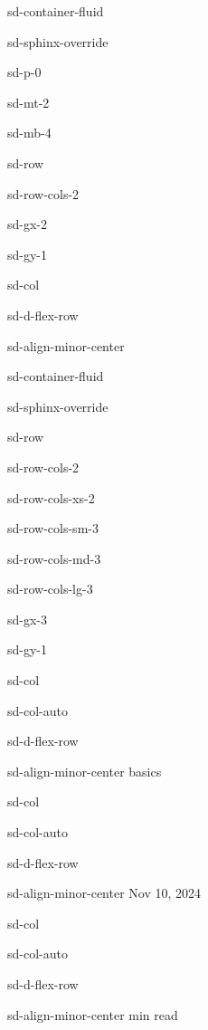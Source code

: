 \documentclass[letterpaper,10pt,english]{jupyterBook}
\begin{document}
\begin{sphinxuseclass}{sd-container-fluid}
\begin{sphinxuseclass}{sd-sphinx-override}
\begin{sphinxuseclass}{sd-p-0}
\begin{sphinxuseclass}{sd-mt-2}
\begin{sphinxuseclass}{sd-mb-4}
\begin{sphinxuseclass}{sd-row}
\begin{sphinxuseclass}{sd-row-cols-2}
\begin{sphinxuseclass}{sd-gx-2}
\begin{sphinxuseclass}{sd-gy-1}
\begin{sphinxuseclass}{sd-col}
\begin{sphinxuseclass}{sd-d-flex-row}
\begin{sphinxuseclass}{sd-align-minor-center}
\begin{sphinxuseclass}{sd-container-fluid}
\begin{sphinxuseclass}{sd-sphinx-override}
\begin{sphinxuseclass}{sd-row}
\begin{sphinxuseclass}{sd-row-cols-2}
\begin{sphinxuseclass}{sd-row-cols-xs-2}
\begin{sphinxuseclass}{sd-row-cols-sm-3}
\begin{sphinxuseclass}{sd-row-cols-md-3}
\begin{sphinxuseclass}{sd-row-cols-lg-3}
\begin{sphinxuseclass}{sd-gx-3}
\begin{sphinxuseclass}{sd-gy-1}
\begin{sphinxuseclass}{sd-col}
\begin{sphinxuseclass}{sd-col-auto}
\begin{sphinxuseclass}{sd-d-flex-row}
\begin{sphinxuseclass}{sd-align-minor-center}
\sphinxAtStartPar
basics

\end{sphinxuseclass}
\end{sphinxuseclass}
\end{sphinxuseclass}
\end{sphinxuseclass}
\begin{sphinxuseclass}{sd-col}
\begin{sphinxuseclass}{sd-col-auto}
\begin{sphinxuseclass}{sd-d-flex-row}
\begin{sphinxuseclass}{sd-align-minor-center}
\sphinxAtStartPar
Nov 10, 2024

\end{sphinxuseclass}
\end{sphinxuseclass}
\end{sphinxuseclass}
\end{sphinxuseclass}
\begin{sphinxuseclass}{sd-col}
\begin{sphinxuseclass}{sd-col-auto}
\begin{sphinxuseclass}{sd-d-flex-row}
\begin{sphinxuseclass}{sd-align-minor-center}
 min read


\end{sphinxuseclass}
\end{sphinxuseclass}
\end{sphinxuseclass}
\end{sphinxuseclass}
\end{sphinxuseclass}
\end{sphinxuseclass}
\end{sphinxuseclass}
\end{sphinxuseclass}
\end{sphinxuseclass}
\end{sphinxuseclass}
\end{sphinxuseclass}
\end{sphinxuseclass}
\end{sphinxuseclass}
\end{sphinxuseclass}
\end{sphinxuseclass}
\end{sphinxuseclass}
\end{sphinxuseclass}
\end{sphinxuseclass}
\end{sphinxuseclass}
\end{sphinxuseclass}
\end{sphinxuseclass}
\end{sphinxuseclass}
\end{sphinxuseclass}
\end{sphinxuseclass}
\end{sphinxuseclass}
\end{sphinxuseclass}
\end{document}
